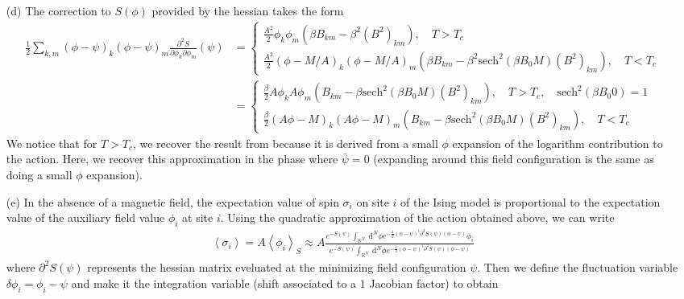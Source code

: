 \documentclass[10pt, a4paper]{article}
\begin{document}
{\begin{enumerate}
\begin{align*}
  \end{align*} 
  \item[(d)] The correction to $S(\phi)$ provided by the hessian takes the form 
  \begin{align*}
    \frac{1}{2} \sum_{k, m}(\phi-\psi)_k(\phi-\psi)_m \frac{\partial^2 S}{\partial \phi_k \partial \phi_m}(\psi) &=  
    \begin{cases}
      \frac{A^2}{2} \phi_k \phi_m (\beta B_{km}-\beta^2 (B^2)_{k m}), \quad T > T_c \\
      \frac{A^2}{2}  (\phi-M/A)_k(\phi-M/A)_m (\beta B_{km}-\beta^2 \text{sech}^2 \left(\beta B_0 M\right)(B^2)_{k m}), \quad T < T_c
    \end{cases}\\
    &=
    \begin{cases}
      \frac{\beta}{2} A\phi_k A\phi_m (B_{km}-\beta \text{sech}^2 \left(\beta B_0 M\right)(B^2)_{k m}), \quad T > T_c, \quad \text{sech}^2 \left(\beta B_0 0\right) = 1 \\
      \frac{\beta}{2}  (A\phi-M)_k(A\phi-M)_m ( B_{km}-\beta \text{sech}^2 \left(\beta B_0 M\right)(B^2)_{k m}), \quad T < T_c
    \end{cases}
  \end{align*}
  We notice that for $T>T_c$, we recover the result from \cite{CitekeyBook} because it is derived from a small $\phi$ expansion of the logarithm contribution to the action. Here, we recover this approximation in the phase where $\bar{\psi} = 0$ (expanding around this field configuration is the same as doing a small $\phi$ expansion).  
  \item[(e)] In the absence of a magnetic field, the expectation value of spin $\sigma_i$ on site $i$ of the Ising model is proportional to the expectation value of the auxiliary field value $\phi_i$ at site $i$. Using the quadratic approximation of the action obtained above, we can write 
  \begin{align*}
    \left\langle\sigma_i\right\rangle=A\left\langle\phi_i\right\rangle_S \approx A \frac{e^{-S(\psi)}\int_{\mathbb{R}^N} \mathrm{~d}^N \phi e^{-\frac{1}{2}(\phi-\psi)^{\mathrm{t}} \partial^2 S(\psi)(\phi-\psi)} \phi_i}{e^{-S(\psi)}\int_{\mathbb{R}^N} \mathrm{~d}^N \phi e^{-\frac{1}{2}(\phi-\psi)^{\mathrm{t}} \partial^2 S(\psi)(\phi-\psi)}}
  \end{align*}
  where $\partial^2 S(\psi)$ represents the hessian matrix eveluated at the minimizing field configuration $\psi$.
  Then we define the fluctuation variable $\delta \phi_i = \phi_i - \psi$ and make it the integration variable (shift associated to a $1$ Jacobian factor) to obtain 

\end{enumerate}}
\end{document}

